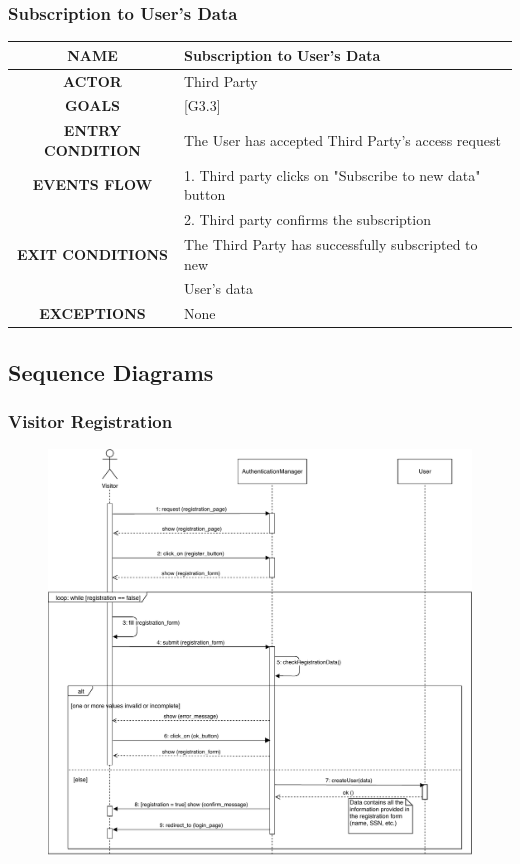 \documentclass[12pt,a4paper]{article}
\begin{document}
		\subsubsection{Subscription to User's Data}
		\begin{center}
			\begin{tabular}{| c | l |}
				\hline
				\textbf{NAME} & Subscription to User's Data \\
				\hline
				\textbf{ACTOR} & Third Party \\
				\hline
				\textbf{GOALS} & [G3.3] \\
				\hline
				\textbf{ENTRY CONDITION} & The User has accepted Third Party's access request \\ \hline
				\textbf{EVENTS FLOW}  &
				1. Third party clicks on "Subscribe to new data" button\\
				&2. Third party confirms the subscription\\
				\hline
				\textbf{EXIT CONDITIONS}  & The Third Party has successfully subscripted to new\\
				& User's data \\ \hline
				\textbf{EXCEPTIONS} &
				None\\
				\hline
			\end{tabular}
		\end{center}

	\subsection{Sequence Diagrams}
		\subsubsection{Visitor Registration}
			\begin{figure}[H]
				\centering
				\includegraphics[width=1.25\linewidth]{Images/registration_sequence}
				\label{fig:registration_sequence}
			\end{figure}
\end{document}
